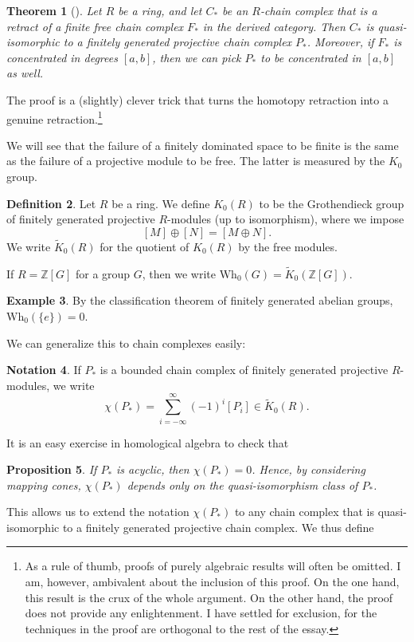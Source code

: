 \documentclass[a4paper, 12pt]{article}
\newtheorem{thm}{Theorem}[section]
\newtheorem{prop}[thm]{Proposition}
\theoremstyle{definition}
\newtheorem{defi}[thm]{Definition}
\newtheorem{notation}[thm]{Notation}
\newtheorem{eg}[thm]{Example}
\newcommand\Z{\mathbb{Z}}
\newcommand\Wh{\mathrm{Wh}}
\newcommand\fakeqed{\pushQED{\qed}\qedhere}
\begin{document}
\begin{thm}[{\cite[Proposition 3.2]{ranicki}}]
  Let $R$ be a ring, and let $C_*$ be an $R$-chain complex that is a retract of a finite free chain complex $F_*$ in the derived category. Then $C_*$ is quasi-isomorphic to a finitely generated projective chain complex $P_*$. Moreover, if $F_*$ is concentrated in degrees $[a, b]$, then we can pick $P_*$ to be concentrated in $[a, b]$ as well.\fakeqed
\end{thm}
The proof is a (slightly) clever trick that turns the homotopy retraction into a genuine retraction.\footnote{As a rule of thumb, proofs of purely algebraic results will often be omitted. I am, however, ambivalent about the inclusion of this proof. On the one hand, this result is the crux of the whole argument. On the other hand, the proof does not provide any enlightenment. I have settled for exclusion, for the techniques in the proof are orthogonal to the rest of the essay.}

We will see that the failure of a finitely dominated space to be finite is the same as the failure of a projective module to be free. The latter is measured by the $K_0$ group.
\begin{defi}
  Let $R$ be a ring. We define $K_0(R)$ to be the Grothendieck group of finitely generated projective $R$-modules (up to isomorphism), where we impose
  \[
    [M] \oplus [N] = [M \oplus N].
  \]
  We write $\tilde{K}_0(R)$ for the quotient of $K_0(R)$ by the free modules.

  If $R = \Z[G]$ for a group $G$, then we write $\Wh_0(G) = \tilde{K}_0(\Z[G])$.
\end{defi}
\begin{eg}
  By the classification theorem of finitely generated abelian groups, $\Wh_0(\{e\}) = 0$.
\end{eg}
We can generalize this to chain complexes easily:
\begin{notation}
  If $P_*$ is a bounded chain complex of finitely generated projective $R$-modules, we write
  \[
    \chi(P_*) = \sum_{i = -\infty}^\infty (-1)^i [P_i] \in \tilde{K}_0(R).
  \]
\end{notation}

It is an easy exercise in homological algebra to check that
\begin{prop}
  If $P_*$ is acyclic, then $\chi(P_*) = 0$. Hence, by considering mapping cones, $\chi(P_*)$ depends only on the quasi-isomorphism class of $P_*$.\fakeqed
\end{prop}
This allows us to extend the notation $\chi(P_*)$ to any chain complex that is quasi-isomorphic to a finitely generated projective chain complex. We thus define
\end{document}
